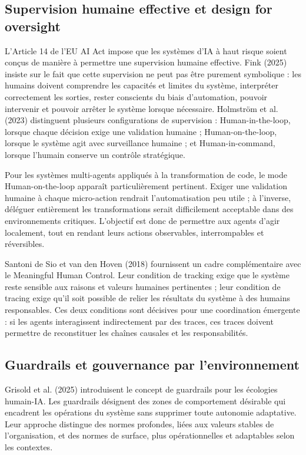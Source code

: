 \subsection{Supervision humaine effective et design for oversight}\label{supervision-humaine-effective-et-design-for-oversight}

L'Article 14 de l'EU AI Act impose que les systèmes d'IA à haut risque soient conçus de manière à permettre une supervision humaine effective. Fink (2025) insiste sur le fait que cette supervision ne peut pas être purement symbolique : les humains doivent comprendre les capacités et limites du système, interpréter correctement les sorties, rester conscients du biais d'automation, pouvoir intervenir et pouvoir arrêter le système lorsque nécessaire. Holmström et al. (2023) distinguent plusieurs configurations de supervision : Human-in-the-loop, lorsque chaque décision exige une validation humaine ; Human-on-the-loop, lorsque le système agit avec surveillance humaine ; et Human-in-command, lorsque l'humain conserve un contrôle stratégique.

Pour les systèmes multi-agents appliqués à la transformation de code, le mode Human-on-the-loop apparaît particulièrement pertinent. Exiger une validation humaine à chaque micro-action rendrait l'automatisation peu utile ; à l'inverse, déléguer entièrement les transformations serait difficilement acceptable dans des environnements critiques. L'objectif est donc de permettre aux agents d'agir localement, tout en rendant leurs actions observables, interrompables et réversibles.

Santoni de Sio et van den Hoven (2018) fournissent un cadre complémentaire avec le Meaningful Human Control. Leur condition de tracking exige que le système reste sensible aux raisons et valeurs humaines pertinentes ; leur condition de tracing exige qu'il soit possible de relier les résultats du système à des humains responsables. Ces deux conditions sont décisives pour une coordination émergente : si les agents interagissent indirectement par des traces, ces traces doivent permettre de reconstituer les chaînes causales et les responsabilités.


\subsection{Guardrails et gouvernance par l'environnement}\label{guardrails-et-gouvernance-par-lenvironnement}

Grisold et al. (2025) introduisent le concept de guardrails pour les écologies humain-IA. Les guardrails désignent des zones de comportement désirable qui encadrent les opérations du système sans supprimer toute autonomie adaptative. Leur approche distingue des normes profondes, liées aux valeurs stables de l'organisation, et des normes de surface, plus opérationnelles et adaptables selon les contextes.

